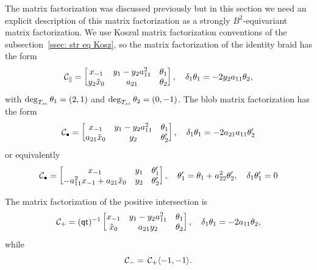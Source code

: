 The matrix factorization was discussed previously but in this section we need an explicit description of this matrix factorization as a strongly
$B^2$-equivariant matrix factorization. We use  Koszul matrix factorization conventions of the subsection~\ref{ssec: str eq Kosz}, so
the matrix factorization of the identity braid has the form
\begin{equation*}
\mathcal{C}_{\parallel} =
\begin{bmatrix}
x_{-1} & y_1 - y_2a_{11}^2 & \theta_1
\\
y_2\tilde{x}_0
& a_{21} & \theta_2
\end{bmatrix},\quad
\delta_{1}\theta_1 = -2y_2a_{11}\theta_2,
\end{equation*}
with $\mathop{{\rm deg}}\nolimits_{T_{sc}}\theta_1=(2,1)$ and $\mathop{{\rm deg}}\nolimits_{T_{sc}}\theta_2=(0,-1)$.
The blob matrix factorization has the form
\begin{equation*}
\mathcal{C}_{\bullet}=
\begin{bmatrix}
x_{-1} & y_1 - y_2a_{11}^2 & \theta_1
\\
a_{21} \tilde{x}_0
& y_2 & \theta_2'
\end{bmatrix},\quad
\delta_{1}\theta_1 = -2a_{21}a_{11}\theta_2'
\end{equation*}
or equivalently
\begin{equation*}
\mathcal{C}_{\bullet}=\begin{bmatrix}
x_{-1} & y_1 & \theta'_1
\\
-a_{11}^2x_{-1}+
a_{21} \tilde{x}_0
& y_2 & \theta_2'
\end{bmatrix},\quad \theta'_1=\theta_1 +a_{22}^2\theta_2',\quad
\delta_{1}\theta'_1 = 0
\end{equation*}

The matrix factorization of the positive intersection is %
\begin{equation*}
\mathcal{C}_{+}= (\mathsf{q}\mathsf{t})^{-1}
\begin{bmatrix}
x_{-1} & y_1 - y_2a_{11}^2 & \theta_1
\\
\tilde{x}_0 & a_{21}y_2 & \theta_2
\end{bmatrix}
,\quad
\delta_{1}\theta_1 = -2a_{11}\theta_2,
\end{equation*}
while
\begin{equation*}
\mathcal{C}_{-} = \,\mathcal{C}_{+}\langle -1,-1 \rangle.
\end{equation*}


